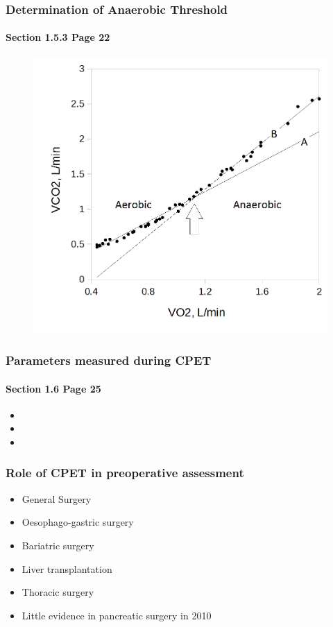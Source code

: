 \documentclass{beamer}
\begin{document}
\begin{frame}
	\frametitle{Determination of Anaerobic Threshold}
	\framesubtitle{Section 1.5.3 Page 22}
	\begin{figure}[htbp]
		\centering
		\includegraphics[width=0.7\linewidth]{../Figures/cpet_vslope}
		\label{fig:cpet_vslope}
	\end{figure}
\end{frame}

\begin{frame}
	\frametitle{Parameters measured during CPET }
	\framesubtitle{ Section 1.6 Page 25}
	\begin{itemize}
		\item
		\item
		\item
	\end{itemize}
\end{frame}

\begin{frame}
	\frametitle{Role of CPET in preoperative assessment}
	\begin{itemize}
		\item General Surgery
		\item Oesophago-gastric surgery
		\item Bariatric surgery
		\item Liver transplantation
		\item Thoracic surgery
		\medskip
		\item Little evidence in pancreatic surgery in 2010
		
	\end{itemize}
\end{frame}
\end{document}

